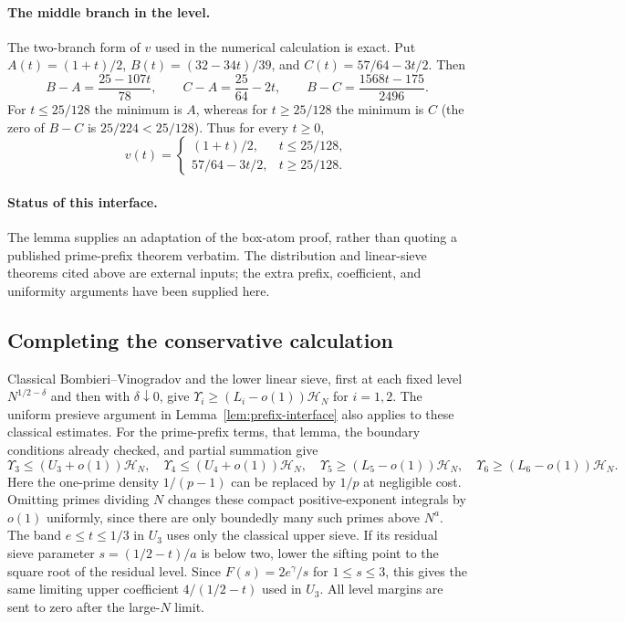 \documentclass[11pt]{article}
\newcommand{\HN}{\mathcal H_N}
\begin{document}
\paragraph{The middle branch in the level.}
The two-branch form of $v$ used in the numerical calculation is exact.
Put $A(t)=(1+t)/2$, $B(t)=(32-34t)/39$, and
$C(t)=57/64-3t/2$. Then
\[
 B-A=\frac{25-107t}{78},\qquad
 C-A=\frac{25}{64}-2t,\qquad
 B-C=\frac{1568t-175}{2496}.
\]
For $t\le25/128$ the minimum is $A$, whereas for $t\ge25/128$
the minimum is $C$ (the zero of $B-C$ is $25/224<25/128$).
Thus for every $t\ge0$,
\[
 v(t)=\begin{cases}
 (1+t)/2,&t\le25/128,\\
 57/64-3t/2,&t\ge25/128.
 \end{cases}
\]

\paragraph{Status of this interface.}
The lemma supplies an adaptation of the box-atom proof, rather than
quoting a published prime-prefix theorem verbatim. The distribution
and linear-sieve theorems cited above are external inputs; the extra
prefix, coefficient, and uniformity arguments have been supplied here.
\subsection{Completing the conservative calculation}

Classical Bombieri--Vinogradov and the lower linear sieve, first at
each fixed level $N^{1/2-\delta}$ and then with $\delta\downarrow0$,
give $\Upsilon_i\ge(L_i-o(1))\HN$ for $i=1,2$.
The uniform presieve argument in Lemma~\ref{lem:prefix-interface}
also applies to these classical estimates.
For the prime-prefix terms, that lemma, the boundary conditions already
checked, and partial summation give
\[
 \Upsilon_3\le(U_3+o(1))\HN,\quad
 \Upsilon_4\le(U_4+o(1))\HN,\quad
 \Upsilon_5\ge(L_5-o(1))\HN,\quad
 \Upsilon_6\ge(L_6-o(1))\HN.
\]
Here the one-prime density $1/(p-1)$ can be replaced by $1/p$ at
negligible cost. Omitting primes dividing $N$ changes these compact
positive-exponent integrals by $o(1)$ uniformly, since there are only
boundedly many such primes above $N^a$. The band $e\le t\le1/3$
in $U_3$ uses only the classical upper sieve. If its residual sieve
parameter $s=(1/2-t)/a$ is below two, lower the sifting point to the
square root of the residual level. Since $F(s)=2e^\gamma/s$ for
$1\le s\le3$, this gives the same limiting upper coefficient
$4/(1/2-t)$ used in $U_3$. All level margins are sent to zero after
the large-$N$ limit.
\end{document}
